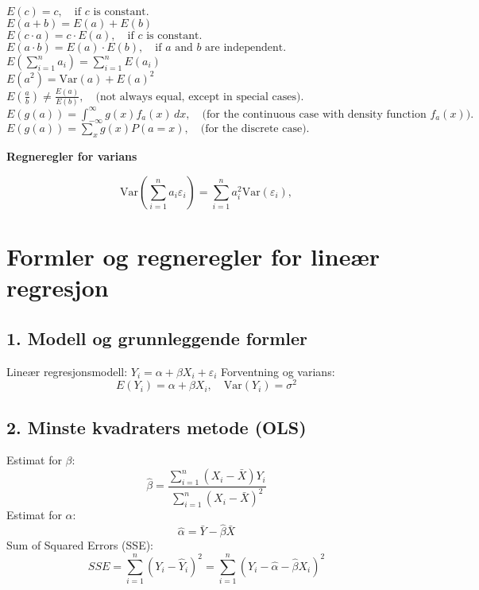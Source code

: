 \documentclass[a4paper,11pt]{article}
\renewcommand{\textbf}[1]{{\scriptsize	\bfseries #1}}
\begin{document}
\begin{footnotesize}
\begin{multicols}{2}
\begin{minipage}{\linewidth}
\(E(c) = c, \quad \text{if } c \text{ is constant.}\) \\
\(E(a + b) = E(a) + E(b)\) \\
\(E(c \cdot a) = c \cdot E(a), \quad \text{if } c \text{ is constant.}\) \\
\(E(a \cdot b) = E(a) \cdot E(b), \quad \text{if } a \text{ and } b \text{ are independent.}\) \\
\(E\left( \sum_{i=1}^n a_i \right) = \sum_{i=1}^n E(a_i)\) \\
\(E(a^2) = \text{Var}(a) + E(a)^2\) \\
\(E\left(\frac{a}{b}\right) \neq \frac{E(a)}{E(b)}, \quad \text{(not always equal, except in special cases).}\) \\
\(E(g(a)) = \int_{-\infty}^\infty g(x) f_a(x) \, dx, \quad \text{(for the continuous case with density function } f_a(x)\text{).}\) \\
\(E(g(a)) = \sum_{x} g(x) P(a = x), \quad \text{(for the discrete case).}\) \\


\end{minipage}
\begin{minipage}{\linewidth}
\textbf{Regneregler for varians}

\[
\mathrm{Var}\left( \sum_{i=1}^{n} a_i \varepsilon_i \right) = \sum_{i=1}^{n} a_i^2 \mathrm{Var}(\varepsilon_i),
\]


\end{minipage}
\begin{minipage}{\linewidth}

\section*{Formler og regneregler for lineær regresjon}

\subsection*{1. Modell og grunnleggende formler}
Lineær regresjonsmodell:
\(
Y_i = \alpha + \beta X_i + \varepsilon_i
\)
Forventning og varians:
\[
E(Y_i) = \alpha + \beta X_i, \quad \text{Var}(Y_i) = \sigma^2
\]
\end{minipage}
\begin{minipage}{\linewidth}

\subsection*{2. Minste kvadraters metode (OLS)}
Estimat for \(\beta\):
\[
\hat{\beta} = \frac{\sum_{i=1}^n (X_i - \bar{X}) Y_i}{\sum_{i=1}^n (X_i - \bar{X})^2}
\]
Estimat for \(\alpha\):
\[
\hat{\alpha} = \bar{Y} - \hat{\beta} \bar{X}
\]
Sum of Squared Errors (SSE):
\[
SSE = \sum_{i=1}^n \left(Y_i - \hat{Y}_i\right)^2 = \sum_{i=1}^n \left(Y_i - \hat{\alpha} - \hat{\beta} X_i\right)^2
\]


\end{minipage}
\end{multicols}
\end{footnotesize}
\end{document}
